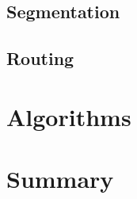 \documentclass{article}
\begin{document}
\subsection{Segmentation}

\subsection{Routing}

\section{Algorithms}

\section{Summary}
\end{document}
